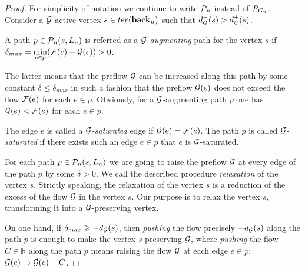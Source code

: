 \documentclass[12pt,oneside,a4paper]{amsart}
\begin{document}
\begin{proof}
        For simplicity of notation we continue to write $\gnpaths$ instead of $\cal{P}_{G_n}$.
        Consider a $\cal{G}$-active vertex $s \in \ter(\eback_n)$ such that $d_{\cal{G}}^{-}(s) > d_{\cal{G}}^{+}(s)$.
        \begin{definition}
          A path $p \in \gnpaths(s, L_n)$ is referred as a \emph{$\cal{G}$-augmenting} path for the vertex $s$
            if $\delta_{max}=\min\limits_{e \in p}(\flowpos(e) - \cal{G}(e)) > 0$.
        \end{definition}
        The latter means that the preflow $\cal{G}$ can be increased along this path by some constant $\delta \leq \delta_{max}$
          in such a fashion that the preflow $\cal{G}(e)$ does not exceed the flow $\flowpos(e)$ for each $e \in p$.
        Obviously, for a $\cal{G}$-augmenting path $p$ one has $\cal{G}(e) < \flowpos(e)$ for each $e \in p$.
        \begin{definition}
          The edge $e$ is called a \emph{$\cal{G}$-saturated} edge if $\cal{G}(e) = \flowpos(e)$.
          The path $p$ is called \emph{$\cal{G}$-saturated} if there exists such an edge $e \in p$ that $e$ is $\cal{G}$-saturated.
        \end{definition}
        For each path $p \in \gnpaths(s, L_n)$ we are going to raise the preflow $\cal{G}$ at every edge of the path $p$
        by some $\delta > 0$.
        We call the described procedure \emph{relaxation} of the vertex $s$.
        Strictly speaking, the {relaxation}
          of the vertex $s$ is a reduction of the excess of the flow $\cal{G}$ in the vertex $s$.
        Our purpose is to relax the vertex $s$, transforming it into a $\cal{G}$-preserving vertex.

        On one hand, if $\delta_{max} \geq -d_{\cal{G}}(s)$, then \emph{pushing} the flow precisely $-d_{\cal{G}}(s)$ along the path $p$
          is enough to make the vertex $s$ preserving $\cal{G}$, where 
          \emph{pushing} the flow $C \in \mathbb{R}$ along the path $p$ means raising the flow $\cal{G}$ at each edge $e \in p$:
          $\cal{G}(e) \to \cal{G}(e) + C$.


\end{proof}
\end{document}
